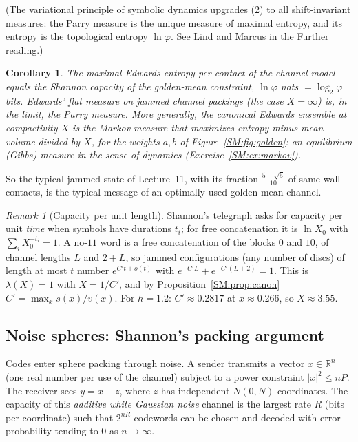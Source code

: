 \documentclass[11pt,openany]{book}
\theoremstyle{plain}
\newtheorem{corollary}[theorem]{Corollary}
\theoremstyle{definition}
\theoremstyle{remark}
\newtheorem{remark}[theorem]{Remark}
\newcommand{\R}{\mathbb{R}}
\newcommand{\abs}[1]{\left\lvert #1 \right\rvert}
\begin{document}
(The variational principle of symbolic dynamics upgrades (2) to all shift-invariant measures: the Parry
measure is the unique measure of maximal entropy, and its entropy is the topological entropy
$\ln\varphi$. See Lind and Marcus in the Further reading.)

\begin{corollary}\label{SM:cor:capacity}
The maximal Edwards entropy per contact of the channel model equals the Shannon capacity of the
golden-mean constraint, $\ln\varphi$ nats $=\log_2\varphi$ bits. Edwards' flat measure on jammed
channel packings (the case $X=\infty$) is, in the limit, the Parry measure. More generally, the
canonical Edwards ensemble at compactivity $X$ is the Markov measure that maximizes entropy minus mean volume divided by $X$, for the weights $a,b$ of
Figure~\ref{SM:fig:golden}: an equilibrium (Gibbs) measure in the sense of dynamics (Exercise~\ref{SM:ex:markov}).
\end{corollary}

So the typical jammed state of Lecture~11, with its fraction $\frac{5-\sqrt5}{10}$ of same-wall contacts, is
the typical message of an optimally used golden-mean channel.

\begin{remark}[Capacity per unit length]
Shannon's telegraph asks for capacity per unit \emph{time} when symbols have durations $t_i$; for free
concatenation it is $\ln X_0$ with $\sum_iX_0^{-t_i}=1$. A no-$11$ word is a free concatenation of the blocks
$0$ and $10$, of channel lengths $L$ and $2+L$, so jammed configurations (any number of discs) of length
at most $t$ number $e^{C't+o(t)}$ with $e^{-C'L}+e^{-C'(L+2)}=1$. This is $\lambda(X)=1$ with $X=1/C'$, and by
Proposition~\ref{SM:prop:canon} $C'=\max_xs(x)/v(x)$. For $h=1.2$: $C'\approx0.2817$ at $x\approx0.266$, so
$X\approx3.55$.
\end{remark}

\subsection{Noise spheres: Shannon's packing argument}

Codes enter sphere packing through noise. A sender transmits a vector $x\in\R^n$ (one real number per
use of the channel) subject to a power constraint $\abs x^2\le nP$. The receiver sees $y=x+z$, where $z$ has
independent $N(0,N)$ coordinates. The capacity of this \emph{additive white Gaussian noise} channel is
the largest rate $R$ (bits per coordinate) such that $2^{nR}$ codewords can be chosen and decoded with
error probability tending to $0$ as $n\to\infty$.
\end{document}
